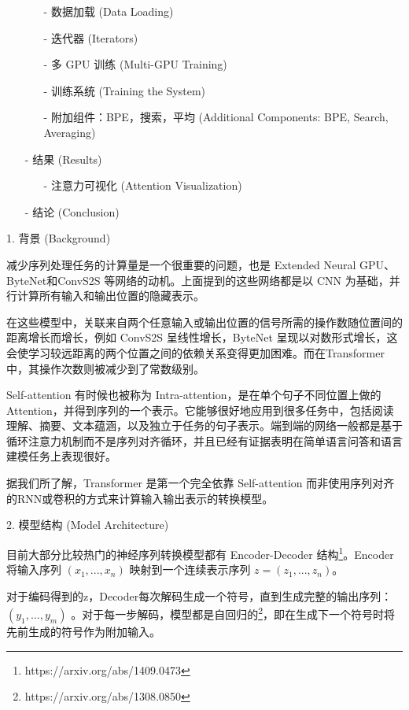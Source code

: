 \begin{itemize}
\begin{itemize}
\item [-] 数据加载 (Data Loading)
\item [-] 迭代器 (Iterators)
\item [-] 多 GPU 训练 (Multi-GPU Training)
\item [-] 训练系统 (Training the System)
\item [-] 附加组件：BPE，搜索，平均 (Additional Components: BPE, Search, Averaging)
\end{itemize}
\item [-] 结果 (Results)
\begin{itemize}
\item [-] 注意力可视化 (Attention Visualization)
\end{itemize}
\item [-] 结论 (Conclusion)
\end{itemize}

1. 背景 (Background)

减少序列处理任务的计算量是一个很重要的问题，也是 Extended Neural GPU、ByteNet和ConvS2S 等网络的动机。上面提到的这些网络都是以  CNN 为基础，并行计算所有输入和输出位置的隐藏表示。

在这些模型中，关联来自两个任意输入或输出位置的信号所需的操作数随位置间的距离增长而增长，例如 ConvS2S 呈线性增长，ByteNet 呈现以对数形式增长，这会使学习较远距离的两个位置之间的依赖关系变得更加困难。而在Transformer中，其操作次数则被减少到了常数级别。

Self-attention 有时候也被称为 Intra-attention，是在单个句子不同位置上做的 Attention，并得到序列的一个表示。它能够很好地应用到很多任务中，包括阅读理解、摘要、文本蕴涵，以及独立于任务的句子表示。端到端的网络一般都是基于循环注意力机制而不是序列对齐循环，并且已经有证据表明在简单语言问答和语言建模任务上表现很好。

据我们所了解，Transformer 是第一个完全依靠 Self-attention 而非使用序列对齐的RNN或卷积的方式来计算输入输出表示的转换模型。

2. 模型结构 (Model Architecture)

目前大部分比较热门的神经序列转换模型都有 Encoder-Decoder 结构\footnote{https://arxiv.org/abs/1409.0473}。Encoder将输入序列 $(x_1, ..., x_n) $ 映射到一个连续表示序列 $z = (z_1, ..., z_n) $。

对于编码得到的z，Decoder每次解码生成一个符号，直到生成完整的输出序列：$(y_1, ..., y_m)$ 。对于每一步解码，模型都是自回归的\footnote{https://arxiv.org/abs/1308.0850}，即在生成下一个符号时将先前生成的符号作为附加输入。

